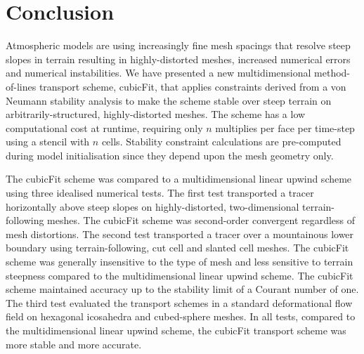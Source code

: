 \section{Conclusion}
\label{sec:conclusion}

Atmospheric models are using increasingly fine mesh spacings that resolve steep slopes in terrain resulting in highly-distorted meshes, increased numerical errors and numerical instabilities.
We have presented a new multidimensional method-of-lines transport scheme, cubicFit, that applies constraints derived from a von Neumann stability analysis to make the scheme stable over steep terrain on arbitrarily-structured, highly-distorted meshes.
The scheme has a low computational cost at runtime, requiring only $n$ multiplies per face per time-step using a stencil with $n$ cells.  Stability constraint calculations are pre-computed during model initialisation since they depend upon the mesh geometry only.

The cubicFit scheme was compared to a multidimensional linear upwind scheme using three idealised numerical tests.
The first test transported a tracer horizontally above steep slopes on highly-distorted, two-dimensional terrain-following meshes.  The cubicFit scheme was second-order convergent regardless of mesh distortions.
The second test transported a tracer over a mountainous lower boundary using terrain-following, cut cell and slanted cell meshes.
The cubicFit scheme was generally insensitive to the type of mesh and less sensitive to terrain steepness compared to the multidimensional linear upwind scheme.
The cubicFit scheme maintained accuracy up to the stability limit of a Courant number of one.
The third test evaluated the transport schemes in a standard deformational flow field on hexagonal icosahedra and cubed-sphere meshes.
In all tests, compared to the multidimensional linear upwind scheme, the cubicFit transport scheme was more stable and more accurate.

